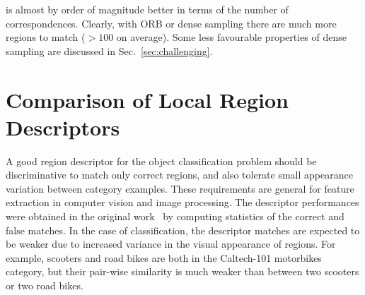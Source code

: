 \documentclass[journal]{IEEEtran}
\begin{document}
is almost by order of magnitude better in terms of the number of
correspondences. Clearly, with ORB or dense sampling there
are much more regions to match ($> 100$ on average). Some less favourable
properties of dense sampling are discussed in Sec.~\ref{sec:challenging}.


%
\section{Comparison of Local Region Descriptors\label{sec:descriptorcomparison}}
%
A good region descriptor for the object classification problem should be
discriminative to match only correct regions, and also tolerate
small appearance variation between category examples. These requirements are
general for feature extraction in computer vision and image
processing. The descriptor performances were obtained in the original
work~\cite{MikSch:2005} by computing statistics of the correct and false
matches. In the case of classification, the descriptor matches are expected to
be weaker due to increased variance in the visual appearance of regions.
For example, scooters and road bikes are both in the
Caltech-101 motorbikes category, but their pair-wise similarity
is much weaker than between two scooters or two road bikes.
\end{document}
